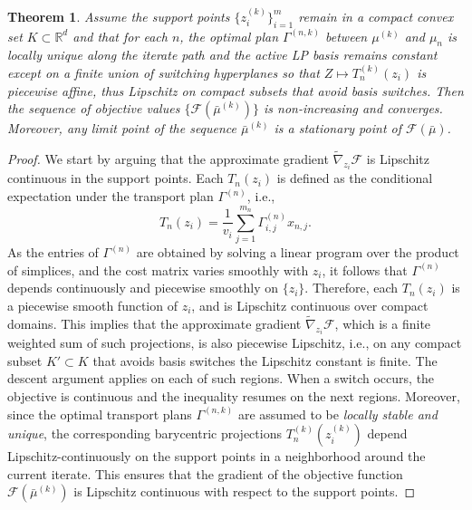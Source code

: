 \documentclass[11pt]{article}
\newtheorem{theorem}{Theorem}[section]
\begin{document}
\begin{theorem}\label{theory:monotonic_descent_and_convergence}
    Assume the support points $\{z_i^{(k)}\}_{i=1}^m$ remain in a compact convex set $K \subset \mathbb{R}^d$ and that for each $n$, the optimal plan $\Gamma^{(n,k)}$ between $\mu^{(k)}$ and $\mu_n$ is locally unique along the iterate path and the active LP basis remains constant except on a finite union of switching hyperplanes so that $Z \mapsto T_n^{(k)}(z_i)$ is piecewise affine, thus Lipschitz on compact subsets that avoid basis switches. Then the sequence of objective values $\{\mathcal{F}(\bar{\mu}^{(k)})\}$ is non-increasing and converges. Moreover, any limit point of the sequence $\bar{\mu}^{(k)}$ is a stationary point of $\mathcal{F}(\bar{\mu})$.
\end{theorem}


\begin{proof}
    We start by arguing that the approximate gradient $\widetilde{\nabla}_{z_i}\mathcal{F}$ is Lipschitz continuous in the support points. Each $T_n(z_i)$ is defined as the conditional expectation under the transport plan $\Gamma^{(n)}$, i.e.,
    \begin{equation*}
        T_n(z_i) = \frac{1}{v_i} \sum_{j=1}^{m_n} \Gamma_{i,j}^{(n)} x_{n,j}.
    \end{equation*}
    As the entries of $\Gamma^{(n)}$ are obtained by solving a linear program over the product of simplices, and the cost matrix varies smoothly with $z_i$, it follows that $\Gamma^{(n)}$ depends continuously and piecewise smoothly on $\{z_i\}$. Therefore, each $T_n(z_i)$ is a piecewise smooth function of $z_i$, and is Lipschitz continuous over compact domains. This implies that the approximate gradient $\widetilde{\nabla}_{z_i} \mathcal{F}$, which is a finite weighted sum of such projections, is also piecewise Lipschitz, i.e., on any compact subset $K'\subset K$ that avoids basis switches the Lipschitz constant is finite. The descent argument applies on each of such regions. When a switch occurs, the objective is continuous and the inequality resumes on the next regions. Moreover, since the optimal transport plans $\Gamma^{(n,k)}$ are assumed to be \emph{locally stable and unique}, the corresponding barycentric projections $T_n^{(k)}(z_i^{(k)})$ depend Lipschitz-continuously on the support points in a neighborhood around the current iterate. This ensures that the gradient of the objective function $\mathcal{F}(\bar{\mu}^{(k)})$ is Lipschitz continuous with respect to the support points.


\end{proof}
\end{document}
